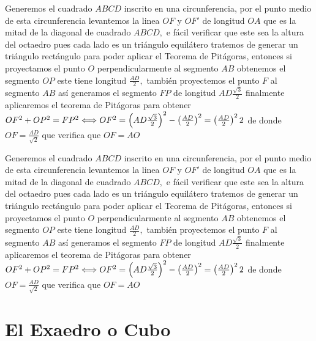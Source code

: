 Generemos el cuadrado  $ABCD$ inscrito en una circunferencia, por el punto medio de esta circunferencia levantemos la linea $OF$ y $OF'$ de longitud $OA$ que es la mitad de la diagonal de cuadrado $ABCD,$ e fácil verificar que este sea la altura del octaedro pues cada lado es un triángulo equilátero tratemos de generar un triángulo rectángulo para poder aplicar el Teorema de Pitágoras, entonces si proyectamos el punto $O$ perpendicularmente al  segmento $AB$ obtenemos el segmento $OP$ este tiene longitud $\frac{AD}{2},$ también proyectemos el punto $F$ al segmento $AB$ así generamos el segmento $FP$ de longitud $AD\frac{\sqrt{3}}{2}$ finalmente aplicaremos el teorema de Pitágoras para obtener $OF^2+OP^2=FP^2\Longleftrightarrow OF^2=\left(AD\frac{\sqrt{3}}{2}\right)^2-\left(\frac{AD}{2}\right)^2
=\left(\frac{AD}{2}\right)^22$ de donde $OF=\frac{AD}{\sqrt{2}}$ que verifica que $OF=AO$


Generemos el cuadrado  $ABCD$ inscrito en una circunferencia, por el punto medio de esta circunferencia levantemos la linea $OF$ y $OF'$ de longitud $OA$ que es la mitad de la diagonal de cuadrado $ABCD,$ e fácil verificar que este sea la altura del octaedro pues cada lado es un triángulo equilátero tratemos de generar un triángulo rectángulo para poder aplicar el Teorema de Pitágoras, entonces si proyectamos el punto $O$ perpendicularmente al  segmento $AB$ obtenemos el segmento $OP$ este tiene longitud $\frac{AD}{2},$ también proyectemos el punto $F$ al segmento $AB$ así generamos el segmento $FP$ de longitud $AD\frac{\sqrt{3}}{2}$ finalmente aplicaremos el teorema de Pitágoras para obtener $OF^2+OP^2=FP^2\Longleftrightarrow OF^2=\left(AD\frac{\sqrt{3}}{2}\right)^2-\left(\frac{AD}{2}\right)^2
=\left(\frac{AD}{2}\right)^22$ de donde $OF=\frac{AD}{\sqrt{2}}$ que verifica que $OF=AO$



\section{El Exaedro o Cubo}

